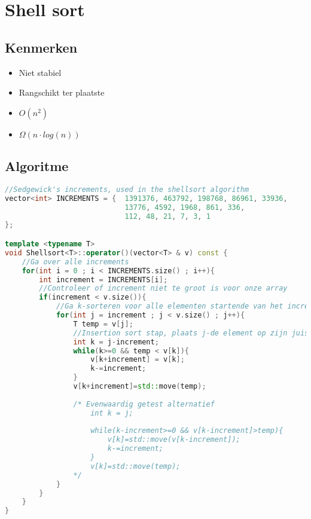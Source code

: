 \documentclass[a4paper]{article}
\begin{document}
\section{Shell sort}
\subsection*{Kenmerken}
\begin{itemize}
	\item Niet stabiel
	\item Rangschikt ter plaatste
	\item $O(n^2)$
	\item $\Omega(n \cdot log(n))$
\end{itemize}

\subsection*{Algoritme}
\begin{lstlisting}[language=C++]
//Sedgewick's increments, used in the shellsort algorithm
vector<int> INCREMENTS = {  1391376, 463792, 198768, 86961, 33936,
                            13776, 4592, 1968, 861, 336,
                            112, 48, 21, 7, 3, 1
};

template <typename T>
void Shellsort<T>::operator()(vector<T> & v) const {
	//Ga over alle increments
    for(int i = 0 ; i < INCREMENTS.size() ; i++){
        int increment = INCREMENTS[i];
        //Controleer of increment niet te groot is voor onze array
        if(increment < v.size()){
            //Ga k-sorteren voor alle elementen startende van het increment
            for(int j = increment ; j < v.size() ; j++){
                T temp = v[j];
                //Insertion sort stap, plaats j-de element op zijn juiste plek, telkens increment-stapjes verder springend
                int k = j-increment;
                while(k>=0 && temp < v[k]){
                	v[k+increment] = v[k];
                	k-=increment;
                }
                v[k+increment]=std::move(temp);
                
                /* Evenwaardig getest alternatief 
		            int k = j;
		            
		            while(k-increment>=0 && v[k-increment]>temp){
		                v[k]=std::move(v[k-increment]);
		                k-=increment;
		            }
		            v[k]=std::move(temp);
                */
            }
        }
    }
}
\end{lstlisting}
\end{document}
